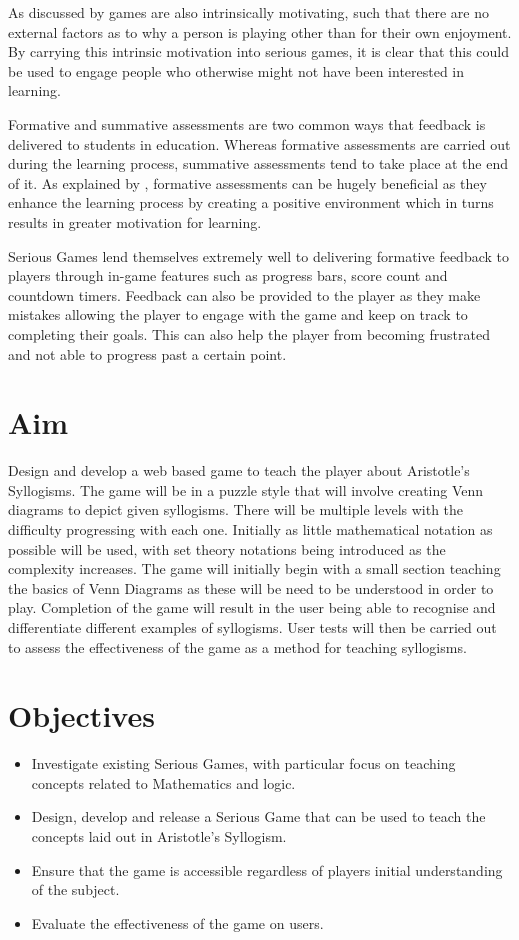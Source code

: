 \documentclass[12pt,a4paper]{report}
\begin{document}
As discussed by \cite{malone1981toward} games are also intrinsically motivating, such that there are no external factors as to why a person is playing other than for their own enjoyment. By carrying this intrinsic motivation into serious games, it is clear that this could be used to engage people who otherwise might not have been interested in learning. 

Formative and summative assessments are two common ways that feedback is delivered to students in education. Whereas formative assessments are carried out during the learning process, summative assessments tend to take place at the end of it. As explained by \cite{irons2007enhancing}, formative assessments can be hugely beneficial as they enhance the learning process by creating a positive environment which in turns results in greater motivation for learning. 

Serious Games lend themselves extremely well to delivering formative feedback to players through in-game features such as progress bars, score count and countdown timers. Feedback can also be provided to the player as they make mistakes allowing the player to engage with the game and keep on track to completing their goals. This can also help the player from becoming frustrated and not able to progress past a certain point.


\section{Aim}
Design and develop a web based game to teach the player about Aristotle's Syllogisms. The game will be in a puzzle style that will involve creating Venn diagrams to depict given syllogisms. There will be multiple levels with the difficulty progressing with each one. Initially as little mathematical notation as possible will be used, with set theory notations being introduced as the complexity increases. The game will initially begin with a small section teaching the basics of Venn Diagrams as these will be need to be understood in order to play. Completion of the game will result in the user being able to recognise and differentiate different examples of syllogisms. User tests will then be carried out to assess the effectiveness of the game as a method for teaching syllogisms. 
\section{Objectives}
\begin{itemize}
  \item Investigate existing Serious Games, with particular focus on teaching concepts related to Mathematics and logic.

  \item Design, develop and release a Serious Game that can be used to teach the concepts laid out in Aristotle's Syllogism.
  
  \item Ensure that the game is accessible regardless of players initial understanding of the subject.
  \item Evaluate the effectiveness of the game on users.
  
\end{itemize}
\end{document}
